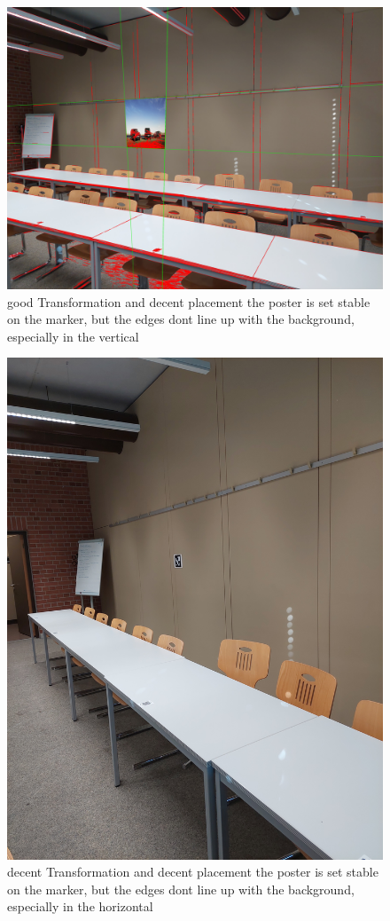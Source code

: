 \documentclass[a4paper,twocolumn]{article}
\begin{document}
\begin{figure}[h!]
\centering
\includegraphics[width=0.9\columnwidth]{img/20221115_113401.jpg} %
\caption{good Transformation and decent placement the poster is set stable on the marker, but the edges dont line up with the background, especially in the vertical}
\label{fig:20221115_113401.jpg}
\end{figure}
\begin{figure}[h!]
\centering
\includegraphics[width=0.9\columnwidth]{img/20221115_113412.jpg} %
\caption{decent Transformation and decent placement the poster is set stable on the marker, but the edges dont line up with the background, especially in the horizontal}
\label{fig:20221115_113412.jpg}
\end{figure}
\end{document}
